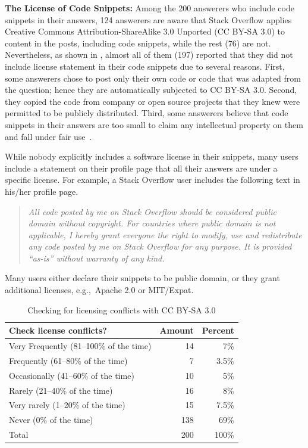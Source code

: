\documentclass[10pt,journal,compsoc]{IEEEtran}
\begin{document}
\textbf{The License of Code Snippets:} Among the 200 answerers who include code snippets in their answers, 124
answerers are aware that Stack Overflow applies Creative Commons
Attribution-ShareAlike 3.0 Unported (CC BY-SA 3.0) to content in the posts,
including code snippets, while the rest (76) are not. Nevertheless, as shown in
, almost all of them (197) reported that they
did not include license statement in their code snippets due to several reasons.
First, some answerers chose to post only their own code or code that was adapted
from the question; hence they are automatically subjected to CC BY-SA 3.0.
Second, they copied the code from company or open source projects that they knew
were permitted to be publicly distributed. Third, some answerers believe that
code snippets in their answers are too small to claim any intellectual property
on them and fall under fair use~\cite{fairuse}.

While nobody explicitly includes a software license in their snippets,
many users include a statement on their profile page that all their
answers are under a specific license. For example, a Stack Overflow user includes 
the following text in his/her profile page.

\begin{quotation}
	\noindent \textit{All code posted by me on
		Stack Overflow should be considered public domain without copyright. For
		countries where public domain is not applicable, I hereby grant everyone the
		right to modify, use and redistribute any code posted by me on Stack Overflow
		for any purpose. It is provided ``as-is'' without warranty of any kind.}
\end{quotation}

Many users either declare their snippets to be public domain, or they grant
additional licenses, e.g.,\ Apache 2.0 or MIT/Expat.

\begin{table}
	\centering
	\caption{Checking for licensing conflicts with CC BY-SA 3.0}
	\label{tab:survey_license_check}
	\begin{tabular}{lrr}
		\toprule
		Check license conflicts? & Amount & Percent \\
		\midrule
		Very Frequently (81--100\% of the time)	& 14 & 7\% \\
		Frequently (61--80\% of the time) & 7 & 3.5\% \\
		Occasionally (41--60\% of the time) & 10 & 5\% \\
		Rarely (21--40\% of the time) & 16 & 8\% \\
		Very rarely (1--20\% of the time) & 15 & 7.5\% \\
		Never (0\% of the time) & 138 & 69\% \\
		\midrule
		Total & 200 & 100\% \\
		\bottomrule
	\end{tabular}
\end{table}
\end{document}
